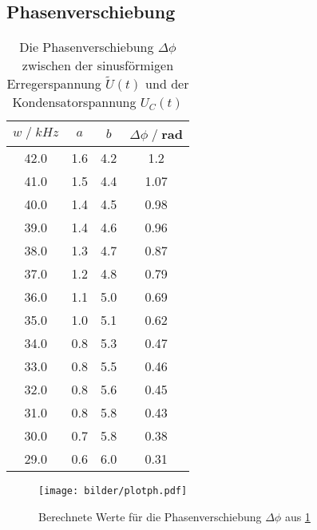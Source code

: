 \subsection{Phasenverschiebung}
\begin{table}
    \centering
    \begin{tabular}{c c c c}
        \toprule
        $w\;/\;kHz$ & $a$ & $b$ & $\Delta \phi\;/\;$rad\\
        \midrule
        42.0 & 1.6 & 4.2 & 1.2 \\
        41.0 & 1.5 & 4.4 & 1.07 \\
        40.0 & 1.4 & 4.5 & 0.98 \\
        39.0 & 1.4 & 4.6 & 0.96 \\
        38.0 & 1.3 & 4.7 & 0.87 \\
        37.0 & 1.2 & 4.8 & 0.79 \\
        36.0 & 1.1 & 5.0 & 0.69 \\
        35.0 & 1.0 & 5.1 & 0.62 \\
        34.0 & 0.8 & 5.3 & 0.47 \\
        33.0 & 0.8 & 5.5 & 0.46 \\
        32.0 & 0.8 & 5.6 & 0.45 \\
        31.0 & 0.8 & 5.8 & 0.43 \\
        30.0 & 0.7 & 5.8 & 0.38 \\
        29.0 & 0.6 & 6.0 & 0.31 \\
        \bottomrule
    \end{tabular}
    \caption{Die Phasenverschiebung $\Delta \phi$ zwischen der sinusförmigen Erregerspannung $\tilde{U}(t)$ und der Kondensatorspannung $U_C(t)$}
    \label{tab:tabelle_phi}
\end{table}
\begin{figure}
    \centering
    \texttt{[image: bilder/plotph.pdf]}
    \caption{
        Berechnete Werte für die Phasenverschiebung $\Delta \phi$ aus \ref{tab:tabelle_phi} 
    }
\end{figure}


























\label{sec:Auswertung}